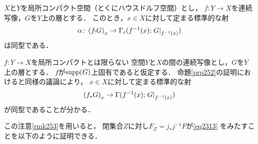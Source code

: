 \begin{PRP}\label{prp252}
    \(X\)と\(Y\)を局所コンパクト空間（とくにハウスドルフ空間）とし，
    \(f\colon Y\to X\)を連続写像，\(G\)を\(Y\)上の層とする．
    このとき，\(x\in X\)に対して定まる標準的な射
    \[
        \alpha\colon \left(f_{!}G\right)_x
        \to
        \Gamma_{c}(f^{-1}(x);\mres[G]{f^{-1}(x)})
    \]
    は同型である．
\end{PRP}

\begin{RMK}\label{rmk253}
    \(f\colon Y\to X\)を局所コンパクトとは限らない
    空間\(Y\)と\(X\)の間の連続写像とし，\(G\)を\(Y\)上の層とする．
    \(f\)が\(\supp(G)\)上固有であると仮定する．
    命題\ref{prp252}の証明におけると同様の議論により，
    \(x\in X\)に対して定まる標準的な射
    \[
        \left(f_{\ast}G\right)_x
        \to
        \Gamma(f^{-1}(x);\mres[G]{f^{-1}(x)})
    \]
    が同型であることが分かる．
\end{RMK}
\begin{CMT}
    この注意\ref{rmk253}を用いると，
    閉集合\(Z\)に対し\(F_Z=j_{\ast}j^{-1}F\)が\eqref{eq2313}
    をみたすことを以下のように証明できる．
\end{CMT}
